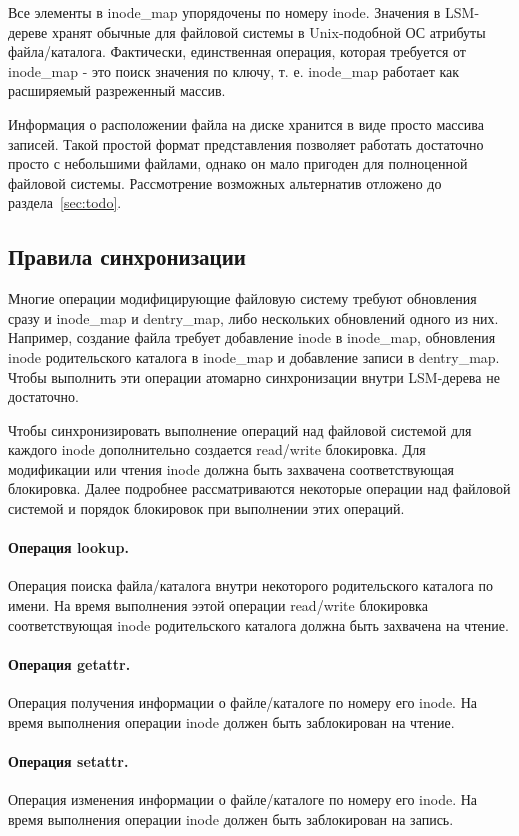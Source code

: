 Все элементы в inode\_map упорядочены по номеру inode. Значения в LSM-дереве
хранят обычные для файловой системы в Unix-подобной ОС атрибуты файла/каталога.
Фактически, единственная операция, которая требуется от inode\_map - это поиск
значения по ключу, т. е. inode\_map работает как расширяемый разреженный массив.

Информация о расположении файла на диске хранится в виде просто массива записей.
Такой простой формат представления позволяет работать достаточно просто с
небольшими файлами, однако он мало пригоден для полноценной файловой системы.
Рассмотрение возможных альтернатив отложено до раздела~\ref{sec:todo}.


\subsection{Правила синхронизации}

Многие операции модифицирующие файловую систему требуют обновления сразу и
inode\_map и dentry\_map, либо нескольких обновлений одного из них. Например,
создание файла требует добавление inode в inode\_map, обновления inode
родительского каталога в inode\_map и добавление записи в dentry\_map. Чтобы
выполнить эти операции атомарно синхронизации внутри LSM-дерева не достаточно.

Чтобы синхронизировать выполнение операций над файловой системой для каждого inode
дополнительно создается read/write блокировка. Для модификации или чтения inode
должна быть захвачена соответствующая блокировка. Далее подробнее
рассматриваются некоторые операции над файловой системой и порядок блокировок
при выполнении этих операций.

\paragraph{Операция lookup.} Операция поиска файла/каталога внутри некоторого
родительского каталога по имени. На время выполнения ээтой операции read/write
блокировка соответствующая inode родительского каталога должна быть захвачена на
чтение.

\paragraph{Операция getattr.} Операция получения информации о файле/каталоге по
номеру его inode. На время выполнения операции inode должен быть заблокирован на
чтение.

\paragraph{Операция setattr.} Операция изменения информации о файле/каталоге по
номеру его inode. На время выполнения операции inode должен быть заблокирован на
запись.

